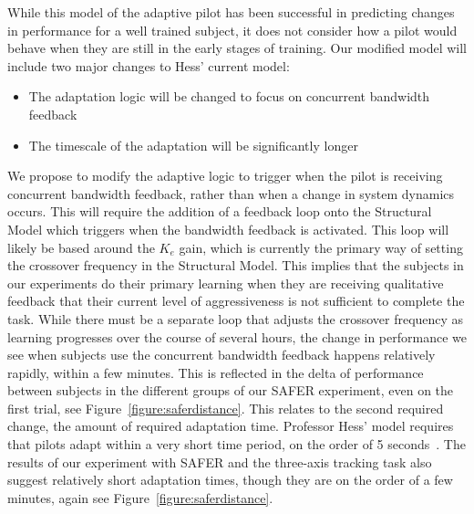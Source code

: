 While this model of the adaptive pilot has been successful in predicting changes in performance for a well trained subject, it does not consider how a pilot would behave when they are still in the early stages of training.
Our modified model will include two major changes to Hess' current model:
\begin{itemize}
    \item The adaptation logic will be changed to focus on concurrent bandwidth feedback
    \item The timescale of the adaptation will be significantly longer
\end{itemize}

We propose to modify the adaptive logic to trigger when the pilot is receiving concurrent bandwidth feedback, rather than when a change in system dynamics occurs.
This will require the addition of a feedback loop onto the Structural Model which triggers when the bandwidth feedback is activated.
This loop will likely be based around the $K_e$ gain, which is currently the primary way of setting the crossover frequency in the Structural Model.
This implies that the subjects in our experiments do their primary learning when they are receiving qualitative feedback that their current level of aggressiveness is not sufficient to complete the task.
While there must be a separate loop that adjusts the crossover frequency as learning progresses over the course of several hours, the change in performance we see when subjects use the concurrent bandwidth feedback happens relatively rapidly, within a few minutes.
This is reflected in the delta of performance between subjects in the different groups of our SAFER experiment, even on the first trial, see Figure~\ref{figure:saferdistance}.
This relates to the second required change, the amount of required adaptation time.
Professor Hess' model requires that pilots adapt within a very short time period, on the order of 5 seconds~\citep{weir_model_1966}.
The results of our experiment with SAFER and the three-axis tracking task also suggest relatively short adaptation times, though they are on the order of a few minutes, again see Figure~\ref{figure:saferdistance}.


